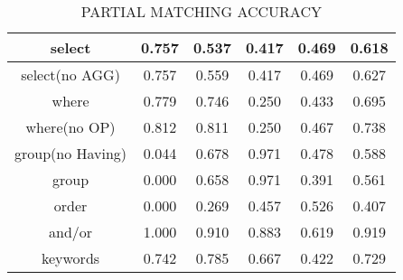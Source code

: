 



\begin{table}[h!]
    \centering
    \begin{tabular}{|c|c|c|c|c|c|}
        \hline
        select           & 0.757 & 0.537 & 0.417 & 0.469 & 0.618 \\ \hline
        select(no AGG)   & 0.757 & 0.559 & 0.417 & 0.469 & 0.627 \\ \hline
        where            & 0.779 & 0.746 & 0.250 & 0.433 & 0.695 \\ \hline
        where(no OP)     & 0.812 & 0.811 & 0.250 & 0.467 & 0.738 \\ \hline
        group(no Having) & 0.044 & 0.678 & 0.971 & 0.478 & 0.588 \\ \hline
        group            & 0.000 & 0.658 & 0.971 & 0.391 & 0.561 \\ \hline
        order            & 0.000 & 0.269 & 0.457 & 0.526 & 0.407 \\ \hline
        and/or           & 1.000 & 0.910 & 0.883 & 0.619 & 0.919 \\ \hline

        keywords         & 0.742 & 0.785 & 0.667 & 0.422 & 0.729 \\ \hline
    \end{tabular}
    \caption{PARTIAL MATCHING ACCURACY}

\end{table}
